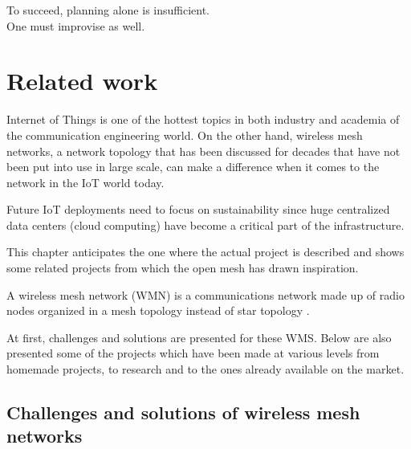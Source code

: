 
\begin{savequote}[70mm]
	To succeed, planning alone is insufficient.\\One must improvise as well.
\end{savequote}


\chapter{Related work}\label{chapter:related_work}

	Internet  of  Things  is  one  of  the  hottest  topics  in 
	both  industry  and  academia  of  the  communication  engineering 
	world.
	On  the  other  hand,  wireless  mesh  networks,  a  network 
	topology that has been discussed for decades that have not been put 
	into use in large scale, can make a difference when it comes to the 
	network  in  the  IoT  world  today.

	Future IoT deployments need to focus on sustainability
	since huge centralized data centers (cloud computing) have
	become a critical part of the infrastructure.

	This chapter anticipates the one where the actual project is described and shows some related projects from which the open mesh has drawn inspiration.
	
	A  wireless  mesh  network  (WMN)  is  a  communications 
	network made up of radio nodes organized in a mesh topology 
	instead of star topology \cite{wms}.
	
	At first, challenges and solutions are presented for these WMS.
	Below are also presented some of the projects which have been made at various levels from homemade projects, to research and to the ones already available on the market.
	
	\section{Challenges and solutions of wireless mesh networks}
		
